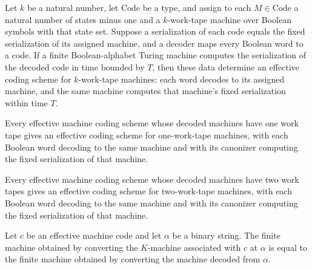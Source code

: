 \begin{definition}
\label{Turing.EffectiveCodeK.ofSerialize}
\leanok
{}
Let $k$ be a natural number, let $\mathrm{Code}$ be a type, and assign to each
$M\in\mathrm{Code}$ a natural number of states minus one and a $k$-work-tape machine
over Boolean symbols with that state set. Suppose a serialization of each code equals
the fixed serialization of its assigned machine, and a decoder maps every Boolean word
to a code. If a finite Boolean-alphabet Turing machine computes the serialization of the
decoded code in time bounded by $T$, then these data determine an effective coding
scheme for $k$-work-tape machines: each word decodes to its assigned machine, and the
same machine computes that machine’s fixed serialization within time $T$.
\end{definition}

\begin{definition}
\label{Turing.EffectiveMachineCode.toK}
\leanok
{}
Every effective machine coding scheme whose decoded machines have one work tape gives an
effective coding scheme for one-work-tape machines, with each Boolean word decoding to
the same machine and with its canonizer computing the fixed serialization of that
machine.
\end{definition}

\begin{definition}
\label{Turing.EffectiveMachineCode2.toK}
\leanok
{}
Every effective machine coding scheme whose decoded machines have two work tapes gives
an effective coding scheme for two-work-tape machines, with each Boolean word decoding
to the same machine and with its canonizer computing the fixed serialization of that
machine.
\end{definition}

\begin{theorem}
\label{Turing.EffectiveMachineCode.toK_toFinTM}
\leanok
{}
Let $c$ be an effective machine code and let $\alpha$ be a binary string. The finite
machine obtained by converting the $K$-machine associated with $c$ at $\alpha$ is equal
to the finite machine obtained by converting the machine decoded from $\alpha$.
\end{theorem}

